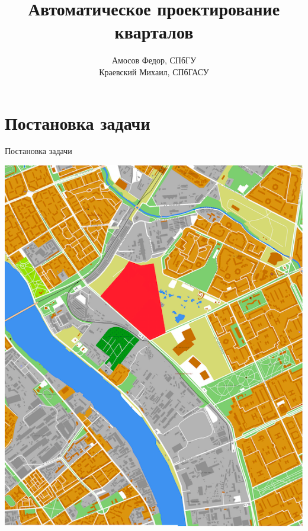 \documentclass[14pt, fleqn, xcolor={dvipsnames, table}]{beamer}
\title{Автоматическое проектирование кварталов}
\author[]{
    \small{
        Амосов Федор, СПбГУ\\
        Краевский Михаил, СПбГАСУ
    }
}
\date{}
\begin{document}
    \begin{frame}
        \maketitle
        \small
    \end{frame}

    \section{Постановка задачи}  
    
        \begin{frame}{Постановка задачи}
            \begin{center}
                \includegraphics[scale=0.26]{top-plan.png}~

\end{center}
\end{frame}
\end{document}
